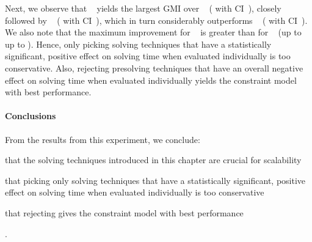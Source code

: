 Next, we observe that ~
yields the largest \gls{GMI} over ~ (\printGMI{%
  \SolvTechDisableAllBadPrePlusSolvingTimeSpeedupPrePlusSolvingTimeRegularSpeedupGmean%
} with \gls{CI}~\printGMICI{%
  \SolvTechDisableAllBadPrePlusSolvingTimeSpeedupPrePlusSolvingTimeRegularSpeedupCiMin%
}{%
  \SolvTechDisableAllBadPrePlusSolvingTimeSpeedupPrePlusSolvingTimeRegularSpeedupCiMax%
}), closely followed by ~
(\printGMI{%
  \SolvTechDisableAllPrePlusSolvingTimeSpeedupPrePlusSolvingTimeRegularSpeedupGmean%
} with \gls{CI}~\printGMICI{%
  \SolvTechDisableAllPrePlusSolvingTimeSpeedupPrePlusSolvingTimeRegularSpeedupCiMin%
}{%
  \SolvTechDisableAllPrePlusSolvingTimeSpeedupPrePlusSolvingTimeRegularSpeedupCiMax%
}),
which in turn considerably outperforms ~
(\printGMI{%
  \SolvTechEnableOnlyAllGoodPrePlusSolvingTimeSpeedupPrePlusSolvingTimeRegularSpeedupGmean%
} with \gls{CI}~\printGMICI{%
  \SolvTechEnableOnlyAllGoodPrePlusSolvingTimeSpeedupPrePlusSolvingTimeRegularSpeedupCiMin%
}{%
  \SolvTechEnableOnlyAllGoodPrePlusSolvingTimeSpeedupPrePlusSolvingTimeRegularSpeedupCiMax%
}).
%
We also note that the maximum improvement for ~ is greater than for ~ (up to \printSpeedup{%
  \SolvTechDisableAllBadPrePlusSolvingTimeSpeedupPrePlusSolvingTimeZeroCenteredSpeedupMax%
} \versus up to \printSpeedup{%
  \SolvTechDisableAllPrePlusSolvingTimeSpeedupPrePlusSolvingTimeZeroCenteredSpeedupMax
}).
%
Hence, only picking solving techniques that have a statistically significant,
positive effect on solving time when evaluated individually is too conservative.
%
Also, rejecting \gls{presolving} techniques that have an overall negative effect
on solving time when evaluated individually yields the \gls{constraint model}
with best performance.


\paragraph{Conclusions}

From the results from this experiment, we conclude:
%
\begin{enumerate*}[label=(\roman*), itemjoin={;\ }, itemjoin*={; and\ }]
  \item that the solving techniques introduced in this chapter are crucial for
    scalability
  \item that picking only solving techniques that have a statistically
    significant, positive effect on solving time when evaluated individually is
    too conservative
  \item that rejecting  gives the \gls{constraint model} with best
    performance
\end{enumerate*}.


